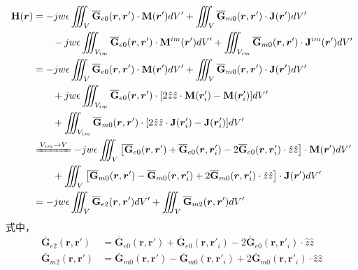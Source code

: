 \documentclass{article}
\numberwithin{equation}{section}
\renewcommand{\vec}[1]{\boldsymbol{#1}}
\begin{document}
\begin{align}
    \label{eq:eq185}
    \mathbf{H}(\vec{r})&=-jw\epsilon\iiint_V\overline{\mathbf{G}}_{e0}(\vec{r},\vec{r}')\cdot \mathbf{M}(\vec{r}')dV'+\iiint_V\overline{\mathbf{G}}_{m0}(\vec{r},\vec{r}')\cdot \mathbf{J}(\vec{r}')dV' \nonumber \\
                       &\qquad-jw\epsilon\iiint_{V_{im}}\overline{\mathbf{G}}_{e0}(\vec{r},\vec{r}')\cdot \mathbf{M}^{im}(\vec{r}')dV'+\iiint_{V_{im}}\overline{\mathbf{G}}_{m0}(\vec{r},\vec{r}')\cdot \mathbf{J}^{im}(\vec{r}')dV' \nonumber \\
                       &=-jw\epsilon\iiint_V\overline{\mathbf{G}}_{e0}(\vec{r},\vec{r}')\cdot \mathbf{M}(\vec{r}')dV'+\iiint_V\overline{\mathbf{G}}_{m0}(\vec{r},\vec{r}')\cdot \mathbf{J}(\vec{r}')dV' \nonumber \\
                       &\qquad+jw\epsilon\iiint_{V_{im}}\overline{\mathbf{G}}_{e0}(\vec{r},\vec{r}')\cdot [2\hat{z}\hat{z}\cdot\mathbf{M}(\vec{r}'_i)-\mathbf{M}(\vec{r}'_i)]dV' \nonumber \\
                       &\qquad+\iiint_{V_{im}}\overline{\mathbf{G}}_{m0}(\vec{r},\vec{r}')\cdot [2\hat{z}\hat{z}\cdot\mathbf{J}(\vec{r}'_i)-\mathbf{J}(\vec{r}'_i)]dV' \nonumber \\
                       &\xlongequal{V_{im}\to V}-jw\epsilon\iiint_V\left[\overline{\mathbf{G}}_{e0}(\vec{r},\vec{r}')+\overline{\mathbf{G}}_{e0}(\vec{r},\vec{r}'_i)-2\overline{\mathbf{G}}_{e0}(\vec{r},\vec{r}'_i)\cdot\hat{z}\hat{z}\right]\cdot\mathbf{M}(\vec{r}')dV' \nonumber \\
                       &\qquad+\iiint_V\left[\overline{\mathbf{G}}_{m0}(\vec{r},\vec{r}')-\overline{\mathbf{G}}_{m0}(\vec{r},\vec{r}'_i)+2\overline{\mathbf{G}}_{m0}(\vec{r},\vec{r}'_i)\cdot\hat{z}\hat{z}\right]\cdot\mathbf{J}(\vec{r}')dV' \nonumber \\
                       &=-jw\epsilon\iiint_V\overline{\mathbf{G}}_{e2}(\vec{r},\vec{r}')dV'+\iiint_V\overline{\mathbf{G}}_{m2}(\vec{r},\vec{r}')dV'
\end{align}
式中，
\begin{align}
    \label{eq:eq186}
    \overline{\mathbf{G}}_{e2}(\vec{r},\vec{r}')&=\overline{\mathbf{G}}_{e0}(\vec{r},\vec{r}')+\overline{\mathbf{G}}_{e0}(\vec{r},\vec{r}'_i)-2\overline{\mathbf{G}}_{e0}(\vec{r},\vec{r}'_i)\cdot\hat{z}\hat{z} \\
    \label{eq:eq187}
    \overline{\mathbf{G}}_{m2}(\vec{r},\vec{r}')&=\overline{\mathbf{G}}_{m0}(\vec{r},\vec{r}')-\overline{\mathbf{G}}_{m0}(\vec{r},\vec{r}'_i)+2\overline{\mathbf{G}}_{m0}(\vec{r},\vec{r}'_i)\cdot\hat{z}\hat{z}
\end{align}
\end{document}
